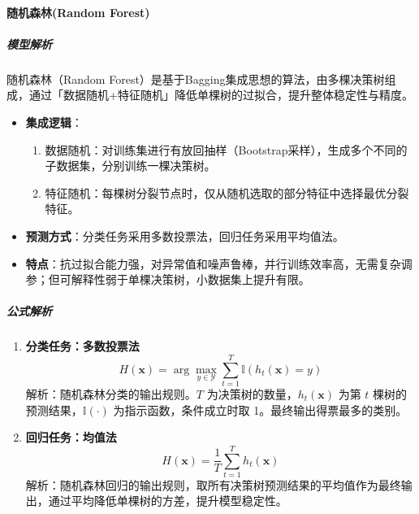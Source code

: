 \documentclass[12pt]{article}
\begin{document}
\paragraph{随机森林(Random Forest)}
\subparagraph{模型解析}
随机森林（Random Forest）是基于Bagging集成思想的算法，由多棵决策树组成，通过「数据随机+特征随机」降低单棵树的过拟合，提升整体稳定性与精度。
\begin{itemize}
    \item \textbf{集成逻辑}：
    \begin{enumerate}
        \item 数据随机：对训练集进行有放回抽样（Bootstrap采样），生成多个不同的子数据集，分别训练一棵决策树。
        \item 特征随机：每棵树分裂节点时，仅从随机选取的部分特征中选择最优分裂特征。
    \end{enumerate}
    \item \textbf{预测方式}：分类任务采用多数投票法，回归任务采用平均值法。
    \item \textbf{特点}：抗过拟合能力强，对异常值和噪声鲁棒，并行训练效率高，无需复杂调参；但可解释性弱于单棵决策树，小数据集上提升有限。
\end{itemize}

\subparagraph{公式解析}
\begin{enumerate}
    \item \textbf{分类任务：多数投票法}
    \[
    H(\boldsymbol{x}) = \arg\max_{y \in \mathcal{Y}} \sum_{t=1}^T \mathbb{I} \left( h_t(\boldsymbol{x}) = y \right)
    \]
    解析：随机森林分类的输出规则。$T$ 为决策树的数量，$h_t(\boldsymbol{x})$ 为第 $t$ 棵树的预测结果，$\mathbb{I}(\cdot)$ 为指示函数，条件成立时取 1。最终输出得票最多的类别。

    \item \textbf{回归任务：均值法}
    \[
    H(\boldsymbol{x}) = \frac{1}{T} \sum_{t=1}^T h_t(\boldsymbol{x})
    \]
    解析：随机森林回归的输出规则，取所有决策树预测结果的平均值作为最终输出，通过平均降低单棵树的方差，提升模型稳定性。
\end{enumerate}
\end{document}
